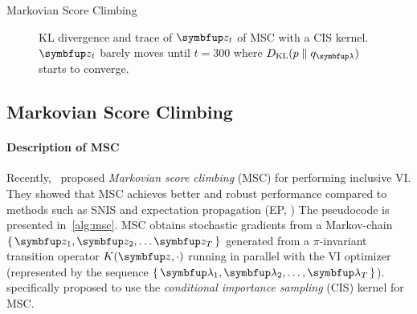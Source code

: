 %
  \begin{minipage}[l]{0.45\linewidth}
    \vspace{-0.1in}
    \small
    \centering
    \begin{algorithm2e}[H]
      \DontPrintSemicolon
      \SetAlgoLined
      \caption{Markovian Score Climbing}\label{alg:msc}
    \end{algorithm2e}
    \vspace{-0.1in}
  \end{minipage}
  \qquad
  \begin{minipage}[r]{0.5\linewidth}
    \vspace{-0.1in}
    \begin{figure}[H]
      \centering
      
      \caption{KL divergence and trace of \(\vz_t\) of MSC with a CIS kernel.
        \(\vz_t\) barely moves until \(t=300\) where \(\DKL{p}{q_{\vlambda}}\) starts to converge.}\label{fig:motivating}
    \end{figure}
    \vspace{-0.1in}
  \end{minipage}
%
\subsection{Markovian Score Climbing}\label{section:msc}
%
\paragraph{Description of MSC}
Recently,~\citet{NEURIPS2020_b2070693} proposed \textit{Markovian score climbing} (MSC) for performing inclusive VI.
They showed that MSC achieves better and robust performance compared to methods such as SNIS and expectation propagation (EP, \citealt{10.5555/2074022.2074067})
The pseudocode is presented in~\cref{alg:msc}.
MSC obtains stochastic gradients from a Markov-chain \(\{\,\vz_1, \vz_2, \ldots \vz_T\,\}\) generated from a \(\pi\)-invariant transition operator \(K(\vz, \cdot)\) running in parallel with the VI optimizer (represented by the sequence \(\{\,\vlambda_1, \vlambda_2, \ldots, \vlambda_T\,\}\)).
\citeauthor{NEURIPS2020_b2070693} specifically proposed to use the \textit{conditional importance sampling} (CIS) kernel for MSC.


